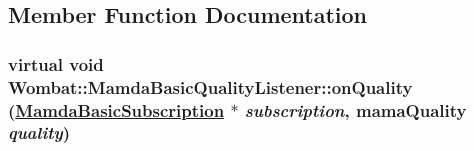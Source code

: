 \subsection{Member Function Documentation}
\hypertarget{classWombat_1_1MamdaBasicQualityListener_1d0c0ead50c8e1c0598d7b0e15864579}{
\subsubsection[onQuality]{\setlength{\rightskip}{0pt plus 5cm}virtual void Wombat::Mamda\-Basic\-Quality\-Listener::on\-Quality (\hyperlink{classWombat_1_1MamdaBasicSubscription}{Mamda\-Basic\-Subscription} $\ast$ {\em subscription}, mama\-Quality {\em quality})}}
\label{classWombat_1_1MamdaBasicQualityListener_1d0c0ead50c8e1c0598d7b0e15864579}


